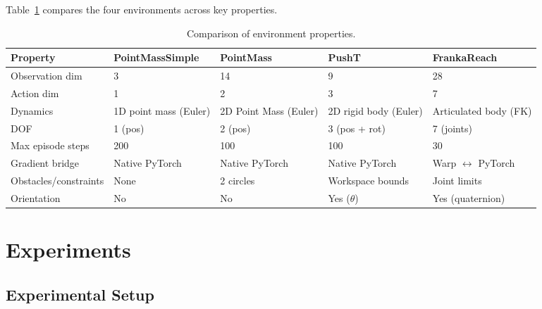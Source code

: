 \documentclass[11pt,a4paper]{article}
\begin{document}
Table~\ref{tab:env_comparison} compares the four environments across key properties.

\begin{table}[htbp]
  \centering
  \small
  \caption{Comparison of environment properties.}
  \label{tab:env_comparison}
  \begin{tabularx}{\textwidth}{@{}lXXXX@{}}
    \toprule
    \textbf{Property} & \textbf{PointMassSimple} & \textbf{PointMass} & \textbf{PushT} & \textbf{FrankaReach} \\
    \midrule
    Observation dim        & 3                    & 14                        & 9                          & 28 \\
    Action dim             & 1                    & 2                         & 3                          & 7 \\
    Dynamics               & 1D point mass (Euler)& 2D Point Mass (Euler)        & 2D rigid body (Euler)      & Articulated body (FK) \\
    DOF                    & 1 (pos)              & 2 (pos)                   & 3 (pos + rot)              & 7 (joints) \\
    Max episode steps      & 200                  & 100                       & 100                        & 30 \\
    Gradient bridge        & Native PyTorch       & Native PyTorch            & Native PyTorch             & Warp $\leftrightarrow$ PyTorch \\
    Obstacles/constraints  & None                 & 2 circles                 & Workspace bounds           & Joint limits \\
    Orientation            & No                   & No                        & Yes ($\theta$)             & Yes (quaternion) \\
    \bottomrule
  \end{tabularx}
\end{table}

\section{Experiments}
\label{sec:experiments}

\subsection{Experimental Setup}
\label{sec:setup}
\end{document}
